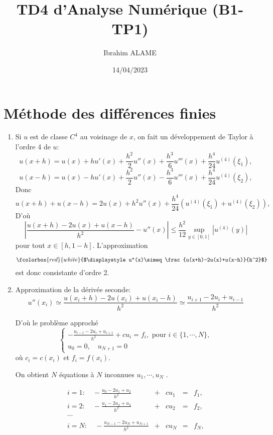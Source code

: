 \documentclass[a4paper,11pt]{article}
\title{TD4 d'Analyse Numérique (B1-TP1) }
\author{Ibrahim ALAME}
\date{14/04/2023}
\newcommand{\myredbox}[1]{\fcolorbox{red}{white}{$\displaystyle#1$}}
\begin{document}
\maketitle

\section{Méthode des différences finies}
\begin{enumerate}
\item Si $u$ est de classe $C^4$ au voisinage de $x$, on fait un développement de Taylor à l'ordre 4 de $u$:
\[u(x+h)=u(x)+h u'(x)+\frac{h^2}2 u''(x)+\frac{h^3}6 u'''(x)+\frac{h^4}{24} u^{(4)}(\xi_1) ,\]
\[u(x-h)=u(x)-h u'(x)+\frac{h^2}2 u''(x)-\frac{h^3}6 u'''(x)+\frac{h^4}{24} u^{(4)}(\xi_2) ,\]
Donc
\[u(x+h)+u(x-h)=2u(x)+h^2 u''(x)+\frac{h^4}{24} \left(u^{(4)}(\xi_1) + u^{(4)}(\xi_2)\right) ,\]
D'où
\[\left| \frac{u(x+h)-2u(x)+u(x-h)}{h^2}- u''(x) \right|\leq \frac{h^2}{12}\sup_{y\in[0,1]} |u^{(4)}(y)| \]
pour tout $x \in [h, 1 - h]$. L'approximation 

 \[\myredbox{u''(x)\simeq \frac{u(x+h)-2u(x)+u(x-h)}{h^2}}\] 
 est donc consistante d'ordre 2. 
\item Approximation de la dérivée seconde:
\[u''(x_i)\simeq \frac{u(x_i+h)-2u(x_i)+u(x_i-h)}{h^2}\simeq \frac{u_{i+1}-2u_i+u_{i-1}}{h^2}\] 


D'où le problème approché
\begin{equation}
\left\{\begin{array}{l}
-{\displaystyle \frac{u_{i-1}-2u_i+u_{i+1}}{h^2}+c u_i }= f_i, \mbox { pour } i\in\{1, \cdots , N\},\\
u_0=0,\quad u_{N+1}=0
\end{array}
\right.
\end{equation}
où $c_i=c(x_i)$ et $f_i=f(x_i)$.

On obtient $N$ équations à $N$ inconnues $u_1, \cdots , u_N$ . 

\[\begin{array}{lllll}
i=1:\quad -{\displaystyle \frac{u_{0}-2u_1+u_{2}}{h^2} }&+&c u_1&=& f_1, \\
i=2:\quad -{\displaystyle \frac{u_{1}-2u_2+u_{3}}{h^2} }&+&c u_2 &= &f_2, \\
\cdots&&&&\\
i=N:\quad -{\displaystyle \frac{u_{N-1}-2u_{N}+u_{N+1}}{h^2} }&+&c u_{N} &=& f_{N},


\end{array}\]
\end{enumerate}
\end{document}
